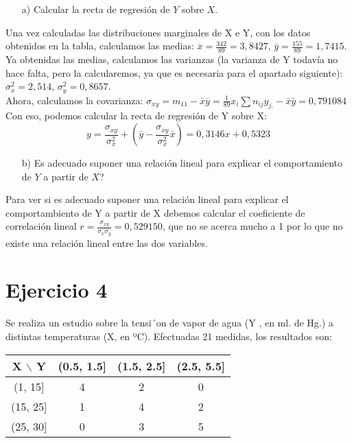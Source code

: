 \documentclass[a4paper,12pt]{article}
\begin{document}
\begin{enumerate}
    \item[a)] Calcular la recta de regresi\'on de $Y$ sobre $X$.
\end{enumerate}

Una vez calculadas las distribuciones marginales de X e Y, con los datos obtenidos en la tabla, calculamos las medias: $\bar x = \frac{342}{89}=3,8427$, $\bar y = \frac{155}{89}=1,7415$.\\
Ya obtenidas las medias, calculamos las varianzas (la varianza de Y todavía no hace falta, pero la calcularemos, ya que es necesaria para el apartado siguiente): $\sigma_x^2 = 2,514$, $\sigma_y^2 = 0,8657$.\\
Ahora, calculamos la covarianza: $\sigma_{xy}=m_{11}-\bar x \bar y = \frac{1}{89} x_i\sum n_{ij} y_{j.} - \bar x \bar y = 0,791084$\\
Con eso, podemos calcular la recta de regresión de Y sobre X:
\[y=\frac{\sigma_{xy}}{\sigma_x^2}+(\bar y - \frac{\sigma_{xy}}{\sigma_x^2} \bar x) = 0,3146x + 0,5323\]

\begin{enumerate}
    \item[b)] \textquestiondown Es adecuado suponer una relaci\'on lineal para explicar el comportamiento de $Y$ a partir de $X$?
\end{enumerate}

Para ver si es adecuado suponer una relación lineal para explicar el comportambiento de Y a partir de X debemos calcular el coeficiente de correlación lineal $r= \frac{\sigma_{xy}}{\sigma_x \sigma_y}=0,529150$, que no se acerca mucho a 1 por lo que no existe una relación lineal entre las dos variables.

\section*{Ejercicio 4}
Se realiza un estudio sobre la tensi´on de vapor de agua (Y , en ml. de Hg.) a distintas temperaturas
(X, en ºC). Efectuadas 21 medidas, los resultados son:
\begin{center}
\begin{tabular}{c|ccc}
X $\backslash$ Y & (0.5, 1.5] & (1.5, 2.5] & (2.5, 5.5] \\
\hline
(1, 15] & 4 & 2 & 0 \\
(15, 25] & 1 & 4 & 2 \\
(25, 30] & 0 & 3 & 5 \\
\end{tabular}
\end{center}
\end{document}
